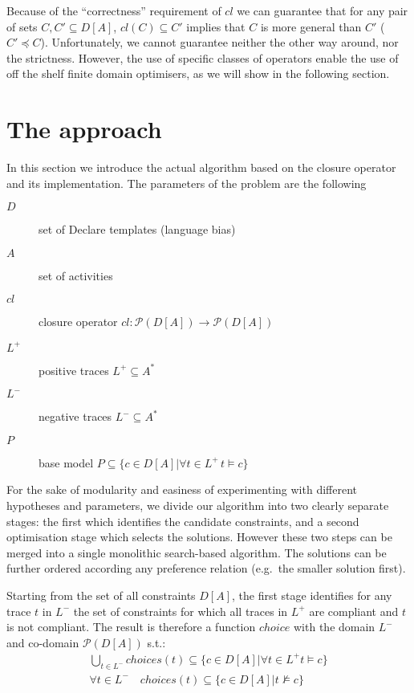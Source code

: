 Because of the ``correctness'' requirement of $cl$ we can guarantee that for any pair of sets $C, C'\subseteq D[A]$, $cl(C)\subseteq C'$ implies that $C$ is more general than $C'$ ($C'\preceq C$). Unfortunately, we cannot guarantee neither the other way around, nor the strictness. However, the use of specific classes of operators enable the use of off the shelf finite domain optimisers, as we will show in the following section. 

\section{The approach}
\label{sec:approach}

In this section we introduce the actual algorithm based on the closure operator and its implementation. The parameters of the problem are the following
\begin{description}
  \item[$D$] set of Declare templates (language bias)
  \item[$A$] set of activities
  \item[$cl$] closure operator $cl: \mathcal{P}(D[A])\rightarrow\mathcal{P}(D[A])$
  \item[$L^+$] positive traces $L^+ \subseteq A^*$
  \item[$L^-$] negative traces $L^- \subseteq A^*$
  \item[$P$] base model $P\subseteq \{c\in D[A]| \forall t\in L^+\, t\models c\}$
\end{description}

For the sake of modularity and easiness of experimenting with different hypotheses and parameters, we divide our algorithm into two clearly separate stages: the first which identifies the candidate constraints, and a second optimisation stage which selects the solutions. However these two steps can be merged into a single monolithic search-based algorithm. The solutions can be further ordered according any preference relation (e.g.\ the smaller solution first).

Starting from the set of all constraints $D[A]$, the first stage identifies for any trace $t$ in $L^-$ the set of constraints for which all traces in $L^+$ are compliant and $t$ is not compliant. The result is therefore a function $choice$ with the domain $L^-$ and co-domain $\mathcal{P}(D[A])$ s.t.:
\begin{subequations}
  \begin{align}
    \bigcup_{t\in L^-} choices(t) \subseteq \{c\in D[A]| \forall t\in L^+ t\models c\} \\
    \forall t\in L^-\quad choices(t)\subseteq \{c\in D[A]| t\not\models c\}
 \end{align}
\end{subequations}

